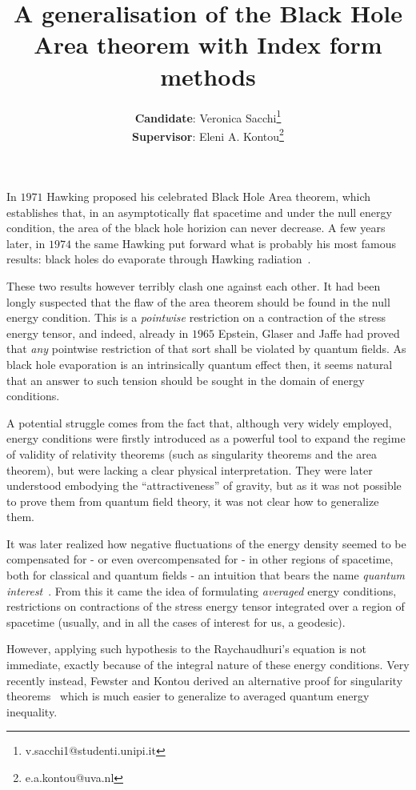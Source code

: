\documentclass[12pt, a4paper]{article}
\title{A generalisation of the Black Hole Area theorem with Index form methods}
\author{\textbf{Candidate}: Veronica Sacchi\thanks{v.sacchi1@studenti.unipi.it}\\
\textbf{Supervisor}: Eleni A. Kontou\thanks{e.a.kontou@uva.nl}}
\begin{document}
\maketitle
In \(1971\) Hawking proposed his celebrated Black Hole Area theorem, which establishes that, in an asymptotically flat spacetime and under the null energy condition, the area of the black hole horizion can never decrease. A few years later, in \(1974\) the same Hawking put forward what is probably his most famous results: black holes do evaporate through Hawking radiation~\cite[]{hawking1975particle}. 

These two results however terribly clash one against each other. It had been longly suspected that the flaw of the area theorem should be found in the null energy condition. This is a \emph{pointwise} restriction on a contraction of the stress energy tensor, and indeed, already in \(1965\) Epstein, Glaser and Jaffe had proved that \emph{any} pointwise restriction of that sort shall be violated by quantum fields. As black hole evaporation is an intrinsically quantum effect then, it seems natural that an answer to such tension should be sought in the domain of energy conditions.

A potential struggle comes from the fact that, although very widely employed, energy conditions were firstly introduced as a powerful tool to expand the regime of validity of relativity theorems (such as singularity theorems and the area theorem), but were lacking a clear physical interpretation. They were later understood embodying the ``attractiveness'' of gravity, but as it was not possible to prove them from quantum field theory, it was not clear how to generalize them. 

It was later realized how negative fluctuations of the energy density seemed to be compensated for - or even overcompensated for - in other regions of spacetime, both for classical and quantum fields - an intuition that bears the name \emph{quantum interest}~\cite[]{ford1999quantum}. From this it came the idea of formulating \emph{averaged} energy conditions, restrictions on contractions of the stress energy tensor integrated over a region of spacetime (usually, and in all the cases of interest for us, a geodesic). 

However, applying such hypothesis to the Raychaudhuri's equation is not immediate, exactly because of the integral nature of these energy conditions. Very recently instead, Fewster and Kontou derived an alternative proof for singularity theorems~\cite[]{fewster2020new} which is much easier to generalize to averaged quantum energy inequality.
\end{document}
